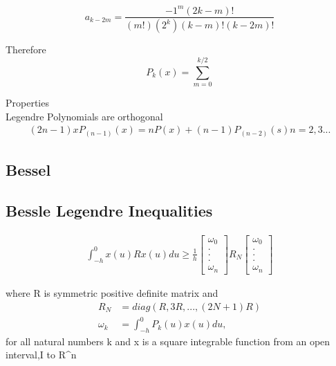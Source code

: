 \documentclass[journal]{IEEEtran}
\begin{document}
    \begin{equation}
    a_{k-2m} = \frac{-1^m(2k-m)!}{(m!)(2^k)(k-m)!(k-2m)!}
  \end{equation}


  
    Therefore
    \begin{equation}
    P_k(x) = \sum_{m=0}^{k/2} 
  \end{equation}

   Properties \\
    Legendre Polynomials are orthogonal
    \begin{align}
    (2n-1)xP_(n-1)(x) = nP(x) + (n-1)P_(n-2)(s) n = 2, 3 ...
  \end{align}

    

\subsection{Bessel}
\subsection{Bessle Legendre Inequalities}
 \begin{align}
   \int_{-h}^{0}x(u)Rx(u)du \geq \frac{1}{h}
   \begin{bmatrix}
     \omega_0 \\
     . \\
     . \\
     . \\
     \omega_n
   \end{bmatrix}
   R_N
   \begin{bmatrix}
  \omega_0 \\
  . \\
  . \\
  . \\
  \omega_n
\end{bmatrix}
 \end{align}

 where R is symmetric positive definite matrix
 and 
 \begin{align}
   R_N &= diag(R,3R,...,(2N+1)R) \\
   \omega_k&= \int_{-h}^{0}P_k(u)x(u)du, 
 \end{align}
 for all natural numbers k and x is a square integrable function
 from an open interval,I to R^n 
\end{document}
